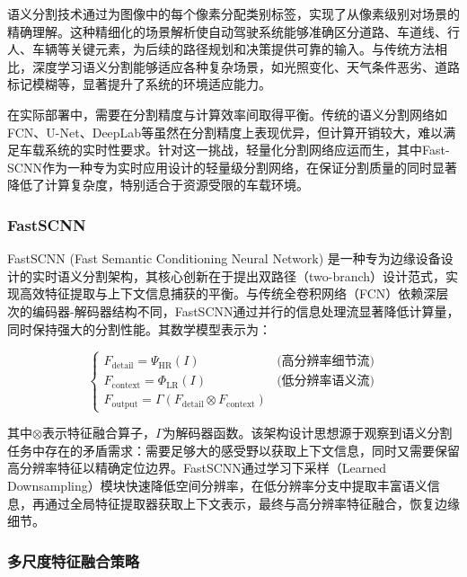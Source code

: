 \documentclass[a4paper, UTF8, fontsize=12pt]{ctexart} %
\numberwithin{equation}{section} %
\begin{document}
语义分割技术通过为图像中的每个像素分配类别标签，实现了从像素级别对场景的精确理解。这种精细化的场景解析使自动驾驶系统能够准确区分道路、车道线、行人、车辆等关键元素，为后续的路径规划和决策提供可靠的输入。与传统方法相比，深度学习语义分割能够适应各种复杂场景，如光照变化、天气条件恶劣、道路标记模糊等，显著提升了系统的环境适应能力。

在实际部署中，需要在分割精度与计算效率间取得平衡。传统的语义分割网络如FCN、U-Net、DeepLab等虽然在分割精度上表现优异，但计算开销较大，难以满足车载系统的实时性要求。针对这一挑战，轻量化分割网络应运而生，其中Fast-SCNN作为一种专为实时应用设计的轻量级分割网络\cite{poudel2019fast}，在保证分割质量的同时显著降低了计算复杂度，特别适合于资源受限的车载环境。

\subsubsection{FastSCNN}

FastSCNN (Fast Semantic Conditioning Neural Network) 是一种专为边缘设备设计的实时语义分割架构，其核心创新在于提出双路径（two-branch）设计范式，实现高效特征提取与上下文信息捕获的平衡。与传统全卷积网络（FCN）依赖深层次的编码器-解码器结构不同，FastSCNN通过并行的信息处理流显著降低计算量，同时保持强大的分割性能。其数学模型表示为：

\begin{equation}
\label{eq:fastscnn}
\left\{ \begin{array}{ll}
F_{\text{detail}} = \Psi_{\text{HR}}(I) & \text{(高分辨率细节流)} \\
F_{\text{context}} = \Phi_{\text{LR}}(I) & \text{(低分辨率语义流)} \\
F_{\text{output}} = \Gamma(F_{\text{detail}} \otimes F_{\text{context}})
\end{array} \right.
\end{equation}

其中$\otimes$表示特征融合算子，$\Gamma$为解码器函数。该架构设计思想源于观察到语义分割任务中存在的矛盾需求：需要足够大的感受野以获取上下文信息，同时又需要保留高分辨率特征以精确定位边界。FastSCNN通过学习下采样（Learned Downsampling）模块快速降低空间分辨率，在低分辨率分支中提取丰富语义信息，再通过全局特征提取器获取上下文表示，最终与高分辨率特征融合，恢复边缘细节。



\subsubsection{多尺度特征融合策略}
\end{document}
